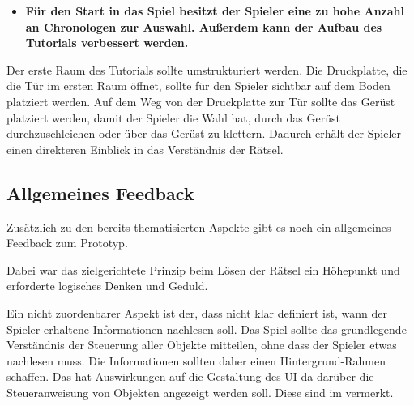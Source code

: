\begin{itemize}  
    \item \textbf{Für den Start in das Spiel besitzt der Spieler eine zu hohe Anzahl an Chronologen zur Auswahl. Außerdem kann der Aufbau des Tutorials verbessert werden.}
\end{itemize}

Der erste Raum des Tutorials sollte umstrukturiert werden. Die Druckplatte, die die Tür im ersten Raum öffnet, sollte für den Spieler sichtbar auf dem Boden platziert werden. Auf dem Weg von der Druckplatte zur Tür sollte das Gerüst platziert werden, damit der Spieler die Wahl hat, durch das Gerüst durchzuschleichen oder über das Gerüst zu klettern. Dadurch erhält der Spieler einen direkteren Einblick in das Verständnis der Rätsel.

\subsection{Allgemeines Feedback}
Zusätzlich zu den bereits thematisierten Aspekte gibt es noch ein allgemeines Feedback zum Prototyp.

Dabei war das zielgerichtete  Prinzip beim Lösen der Rätsel ein Höhepunkt und erforderte logisches Denken und Geduld. 

Ein nicht zuordenbarer Aspekt ist der, dass nicht klar definiert ist, wann der Spieler erhaltene Informationen nachlesen soll. Das Spiel sollte das grundlegende Verständnis der Steuerung aller Objekte mitteilen, ohne dass der Spieler etwas nachlesen muss. Die Informationen sollten daher einen Hintergrund-Rahmen schaffen. Das hat Auswirkungen auf die Gestaltung des \ac{UI} da darüber die Steueranweisung von Objekten angezeigt werden soll. Diese sind im  vermerkt.































